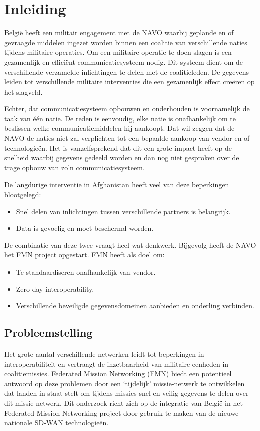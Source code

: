 
\section{Inleiding}%
\label{sec:inleiding}

België heeft een militair engagement met de NAVO waarbij geplande en of gevraagde middelen ingezet worden binnen een coalitie van verschillende naties tijdens militaire operaties. Om een militaire operatie te doen slagen is een gezamenlijk en efficiënt communicatiesysteem nodig. Dit systeem dient om de verschillende verzamelde inlichtingen te delen met de coalitieleden. De gegevens leiden tot verschillende militaire interventies die een gezamenlijk effect creëren op het slagveld.

Echter, dat communicatiesysteem opbouwen en onderhouden is voornamelijk de taak van één natie. De reden is eenvoudig, elke natie is onafhankelijk om te beslissen welke communicatiemiddelen hij aankoopt. Dat wil zeggen dat de NAVO de naties niet zal verplichten tot een bepaalde aankoop van vendor en of technologieën. Het is vanzelfsprekend dat dit een grote impact heeft op de snelheid waarbij gegevens gedeeld worden en dan nog niet gesproken over de trage opbouw van zo’n communicatiesysteem. 

De langdurige interventie in Afghanistan heeft veel van deze beperkingen blootgelegd:
\begin{itemize}
    \item Snel delen van inlichtingen tussen verschillende partners is belangrijk.
    \item Data is gevoelig en moet beschermd worden.
\end{itemize}

De combinatie van deze twee vraagt heel wat denkwerk. Bijgevolg heeft de NAVO het FMN project opgestart. FMN heeft als doel om:
\begin{itemize}
    \item Te standaardiseren onafhankelijk van vendor.
    \item Zero-day interoperability.
    \item Verschillende beveiligde gegevensdomeinen aanbieden en onderling verbinden.
\end{itemize}

\subsection{Probleemstelling}%
Het grote aantal verschillende netwerken leidt tot beperkingen in interoperabiliteit en vertraagt de inzetbaarheid van militaire eenheden in coalitiemissies. Federated Mission Networking (FMN) biedt een potentieel antwoord op deze problemen door een ‘tijdelijk’ missie-netwerk te ontwikkelen dat landen in staat stelt om tijdens missies snel en veilig gegevens te delen over dit missie-netwerk. Dit onderzoek richt zich op de integratie van België in het Federated Mission Networking project door gebruik te maken van de nieuwe nationale SD-WAN technologieën.
